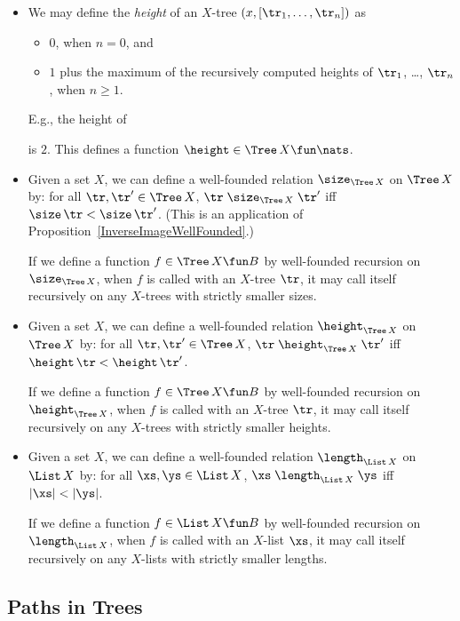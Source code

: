 \begin{itemize}
\item We may define the \emph{height} of an $X$-tree
$(x,[\tr_1,\ldots,\tr_n])$ as
\begin{itemize}
\item $0$, when $n=0$, and

\item $1$ plus the maximum of the recursively computed heights
of $\tr_1$, \ldots, $\tr_n$, when $n\geq 1$.
\end{itemize}
E.g., the height of
\begin{center}

\end{center}
is $2$. This defines a function ${\height}\in\Tree\,X\fun\nats$.

\item Given a set $X$, we can define a well-founded relation
$\size_{\Tree\,X}$ on $\Tree\,X$ by: for all $\tr,\tr'\in\Tree\,X$,
$\tr\mathrel{\size_{\Tree\,X}}\tr'$ iff $\size\,\tr < {\size}\,\tr'$.
(This is an application of Proposition~\ref{InverseImageWellFounded}.)

If we define a function $f\in\Tree\,X\fun B$ by well-founded recursion
on $\size_{\Tree\,X}$, when $f$ is called with an $X$-tree $\tr$,
it may call itself recursively on any $X$-trees with strictly smaller sizes.

\item Given a set $X$, we can define a well-founded relation
$\height_{\Tree\,X}$ on $\Tree\,X$ by: for all $\tr,\tr'\in\Tree\,X$,
$\tr\mathrel{\height_{\Tree\,X}}\tr'$ iff $\height\,\tr < {\height}\,\tr'$.

If we define a function $f\in\Tree\,X\fun B$ by well-founded recursion
on $\height_{\Tree\,X}$, when $f$ is called with an $X$-tree $\tr$,
it may call itself recursively on any $X$-trees with strictly smaller heights.

\item Given a set $X$, we can define a well-founded relation
$\length_{\List\,X}$ on $\List\,X$ by: for all $\xs,\ys\in\List\,X$,
$\xs\mathrel{\length_{\List\,X}}\ys$ iff $|\xs|<|\ys|$.

If we define a function $f\in\List\,X\fun B$ by well-founded recursion
on $\length_{\List\,X}$, when $f$ is called with an $X$-list $\xs$,
it may call itself recursively on any $X$-lists with strictly smaller lengths.
\end{itemize}
%

\subsection{Paths in Trees}

